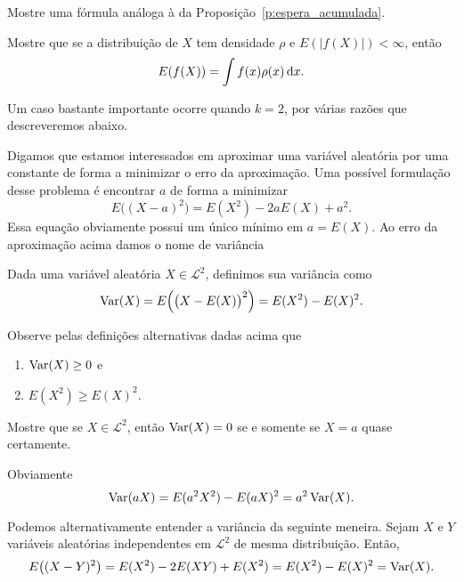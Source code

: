 \begin{exercise}
  Mostre uma fórmula análoga à da Proposição~\ref{p:espera_acumulada}.
\end{exercise}

\begin{exercise}
  Mostre que se a distribuição de $X$ tem densidade $\rho$ e $E(|f(X)|) < \infty$, então
  \begin{equation}
    E(f(X)) = \int f(x) \rho(x) \mathop{}\!\mathrm{d} x.
  \end{equation}
\end{exercise}

Um caso bastante importante ocorre quando $k = 2$, por várias razões que descreveremos abaixo.

Digamos que estamos interessados em aproximar uma variável aleatória por uma constante de forma a minimizar o erro da aproximação.
Uma possível formulação desse problema é encontrar $a$ de forma a minimizar
\begin{equation}
  \label{e:EX_aproxima}
  E\Big( (X - a)^2 \Big) = E(X^2) - 2 a E(X) + a^2.
\end{equation}
Essa equação obviamente possui um único mínimo em $a = E(X)$.
Ao erro da aproximação acima damos o nome de variância

\begin{definition}
  Dada uma variável aleatória $X \in \mathcal{L}^2$, definimos sua variância  como
  \begin{equation}
    \operatorname{Var}(X) = E \Big( \big(X - E(X)\big)^2 \Big) = E(X^2) - E(X)^2.
  \end{equation}
\end{definition}

Observe pelas definições alternativas dadas acima que
\begin{enumerate}[\quad a)]
\item $\operatorname{Var}(X) \geq 0$ e
\item $E(X^2) \geq E(X)^2$.
\end{enumerate}

\begin{exercise}
  Mostre que se $X \in \mathcal{L}^2$, então $\operatorname{Var}(X) = 0$ se e somente se $X = a$ quase certamente.
\end{exercise}

Obviamente
\begin{equation}
  \operatorname{Var}(a X) = E(a^2 X^2) - E(aX)^2 = a^2 \operatorname{Var}(X).
\end{equation}

Podemos alternativamente entender a variância da seguinte meneira.
Sejam $X$ e $Y$ variáveis aleatórias independentes em $\mathcal{L}^2$ de mesma distribuição.
Então,
\begin{equation}
  E\big( (X - Y)^2 \big) = E(X^2) - 2 E(XY) + E(X^2) = E(X^2) - E(X)^2 = \operatorname{Var}(X).
\end{equation}


